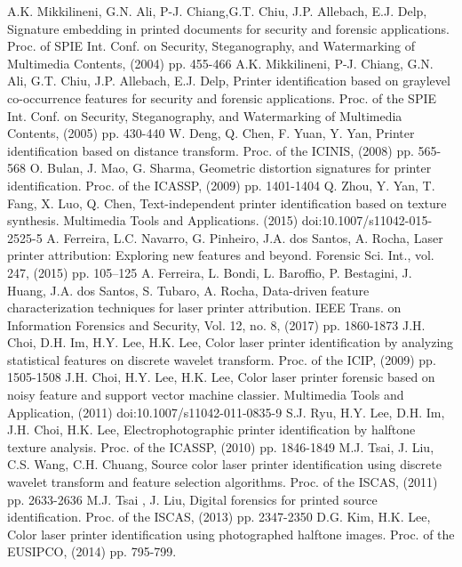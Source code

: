 \documentclass[5p, times]{elsarticle}
\begin{document}
\begin{thebibliography}{1}
A.K. Mikkilineni, G.N. Ali, P-J. Chiang,G.T. Chiu, J.P. Allebach, E.J. Delp, Signature embedding in printed documents for security and forensic applications. Proc. of SPIE Int. Conf. on Security, Steganography, and Watermarking of Multimedia Contents, (2004) pp. 455-466
A.K. Mikkilineni, P-J. Chiang, G.N. Ali, G.T. Chiu, J.P. Allebach, E.J. Delp, Printer identification based on graylevel co-occurrence features for security and forensic applications. Proc. of the SPIE Int. Conf. on Security, Steganography, and Watermarking of Multimedia Contents, (2005) pp. 430-440
W. Deng, Q. Chen, F. Yuan, Y. Yan, Printer identification based on distance transform. Proc. of the ICINIS, (2008) pp. 565-568
O. Bulan, J. Mao, G. Sharma, Geometric distortion signatures for printer identification. Proc. of the ICASSP, (2009) pp. 1401-1404
Q. Zhou, Y. Yan, T. Fang, X. Luo, Q. Chen, Text-independent printer identification based on texture synthesis. Multimedia Tools and Applications. (2015) doi:10.1007/s11042-015-2525-5
A. Ferreira, L.C. Navarro, G. Pinheiro, J.A. dos Santos, A. Rocha, Laser printer attribution: Exploring new features and beyond. Forensic Sci. Int., vol. 247, (2015) pp. 105–125
A. Ferreira, L. Bondi, L. Baroffio, P. Bestagini, J. Huang, J.A. dos Santos, S. Tubaro, A. Rocha, Data-driven feature characterization techniques for laser printer attribution. IEEE Trans. on Information Forensics and Security, Vol. 12, no. 8, (2017) pp. 1860-1873
J.H. Choi, D.H. Im, H.Y. Lee, H.K. Lee, Color laser printer identification by analyzing statistical features on discrete wavelet transform. Proc. of the ICIP, (2009) pp. 1505-1508
J.H. Choi, H.Y. Lee, H.K. Lee, Color laser printer forensic based on noisy feature and support vector machine classier. Multimedia Tools and Application, (2011) doi:10.1007/s11042-011-0835-9
S.J. Ryu, H.Y. Lee, D.H. Im, J.H. Choi, H.K. Lee, Electrophotographic printer identification by halftone texture analysis. Proc. of the ICASSP, (2010) pp. 1846-1849
M.J. Tsai, J. Liu, C.S. Wang, C.H. Chuang, Source color laser printer identification using discrete wavelet transform and feature selection algorithms. Proc. of the ISCAS, (2011) pp. 2633-2636
M.J. Tsai , J. Liu, Digital forensics for printed source identification. Proc. of the ISCAS, (2013) pp. 2347-2350
D.G. Kim, H.K. Lee, Color laser printer identification using photographed halftone images. Proc. of the EUSIPCO, (2014) pp. 795-799.

\end{thebibliography}
\end{document}
